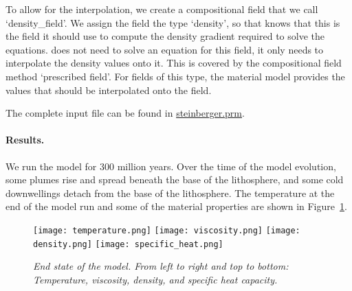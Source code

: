 To allow for the interpolation, we create a compositional field that we call `density\_field'. 
We assign the field the type `density', so that \aspect{} knows that this is the field it should use to compute the density gradient required to solve the equations. \aspect{} does not need to solve an 
equation for this field, it only needs to interpolate the density values onto it. 
This is covered by the compositional field method `prescribed field'. 
For fields of this type, the material model provides the values that should be 
interpolated onto the field.


The complete input file can be found in \url{steinberger.prm}. 

\paragraph{Results.} We run the model for 300 million years. Over the time of the model evolution, some plumes rise and spread beneath the base of the lithosphere, and some cold downwellings detach from the base of the lithosphere. The temperature at the end of the model run and some of the material properties are shown in Figure~\ref{fig:steinberger-end-state}. 

\begin{figure}
  \texttt{[image: temperature.png]}
  \texttt{[image: viscosity.png]}
  \texttt{[image: density.png]}
  \texttt{[image: specific\_heat.png]}
  \caption{\it End state of the model. From left to right and top to bottom: Temperature, viscosity, density, and specific heat capacity.}
  \label{fig:steinberger-end-state}
\end{figure}

